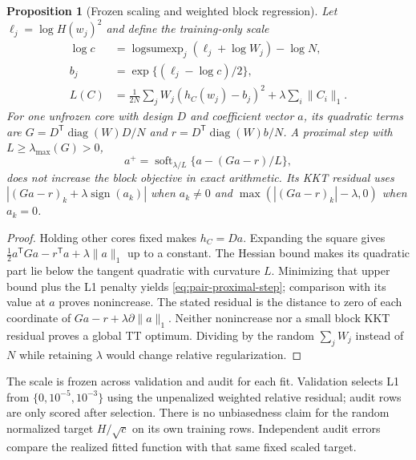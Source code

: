 \documentclass[11pt]{article}
\newtheorem{proposition}{Proposition}
\begin{document}
\begin{proposition}[Frozen scaling and weighted block regression]
\label{prop:pair-weighted-fit}
Let $\ell_j=\log H(w_j)^2$ and define the training-only scale
\begin{equation}
 \begin{aligned}
 \log c&=\operatorname{logsumexp}_j(\ell_j+\log W_j)-\log N,\\
 b_j&=\exp\{(\ell_j-\log c)/2\},\\
 L(C)&=\frac1{2N}\sum_jW_j(h_C(w_j)-b_j)^2+\lambda\sum_i\|C_i\|_1.
 \end{aligned}
 \label{eq:pair-weighted-objective}
\end{equation}
For one unfrozen core with design $D$ and coefficient vector $a$, its quadratic
terms are $G=D^{\mathsf T}\operatorname{diag}(W)D/N$ and
$r=D^{\mathsf T}\operatorname{diag}(W)b/N$. A proximal step with
$L\geq\lambda_{\max}(G)>0$,
\begin{equation}
 a^+=\operatorname{soft}_{\lambda/L}\{a-(Ga-r)/L\},
 \label{eq:pair-proximal-step}
\end{equation}
does not increase the block objective in exact arithmetic. Its KKT residual
uses $|(Ga-r)_k+\lambda\operatorname{sign}(a_k)|$ when $a_k\ne0$ and
$\max(|(Ga-r)_k|-\lambda,0)$ when $a_k=0$.
\end{proposition}
\begin{proof}
Holding other cores fixed makes $h_C=Da$. Expanding the square gives
$\tfrac12a^{\mathsf T}Ga-r^{\mathsf T}a+\lambda\|a\|_1$ up to a constant.
The Hessian bound makes its quadratic part lie below the tangent quadratic
with curvature $L$. Minimizing that upper bound plus the L1 penalty yields
\eqref{eq:pair-proximal-step}; comparison with its value at $a$ proves
nonincrease. The stated residual is the distance to zero of each coordinate
of $Ga-r+\lambda\partial\|a\|_1$. Neither nonincrease nor a small block KKT
residual proves a global TT optimum. Dividing by the random $\sum_jW_j$
instead of $N$ while retaining $\lambda$ would change relative regularization.
\end{proof}

The scale is frozen across validation and audit for each fit. Validation
selects L1 from $\{0,10^{-5},10^{-3}\}$ using the unpenalized weighted
relative residual; audit rows are only scored after selection. There is no
unbiasedness claim for the random normalized target $H/\sqrt c$ on its own
training rows. Independent audit errors compare the realized fitted function
with that same fixed scaled target.
\end{document}
